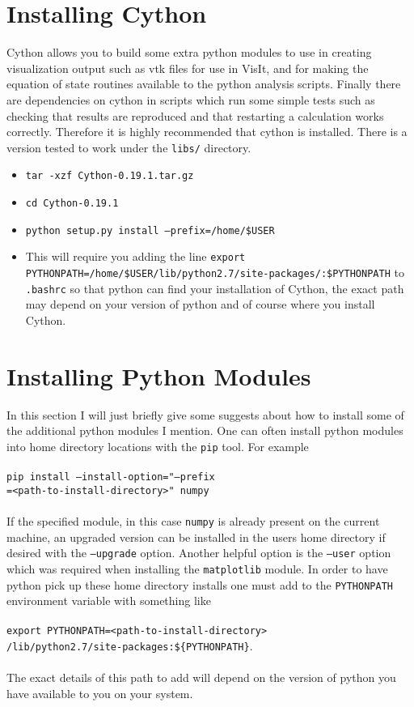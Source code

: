 \documentclass[12pt,a4paper]{book}
\begin{document}
\section{Installing Cython}
Cython allows you to build some extra python modules to use in creating visualization output such as vtk files for use in VisIt, and for making the equation of state routines available to the python analysis scripts. Finally there are dependencies on cython in scripts which run some simple tests such as checking that results are reproduced and that restarting a calculation works correctly. Therefore it is highly recommended that cython is installed. There is a version tested to work under the {\tt libs/} directory.
\begin{itemize}
\item {\tt tar -xzf Cython-0.19.1.tar.gz}
\item {\tt cd Cython-0.19.1}
\item {\tt  python setup.py install --prefix=/home/\-\$USER}
\item This will require you adding the  line {\tt export PYTHONPATH\-=/home/\$USER/\-lib/\-python2.7/\-site-packages/\-:\$PYTHONPATH} to {\tt .bashrc} so that python can find your installation of Cython, the exact path may depend on your version of python and of course where you install Cython.
\end{itemize}

\section{Installing Python Modules}
In this section I will just briefly give some suggests about how to install some of the additional python modules I mention. One can often install python modules into home directory locations with the {\tt pip} tool. For example \\
 \\
{\tt pip install --install-option="--prefix}\\
{\tt=<path-to-install-directory>" numpy}\\
 \\
If the specified module, in this case {\tt numpy} is already present on the current machine, an upgraded version can be installed in the users home directory if desired with the {\tt --upgrade} option. Another helpful option is the {\tt --user} option which was required when installing the {\tt matplotlib} module. In order to have python pick up these home directory installs one must add to the {\tt PYTHONPATH} environment variable with something like \\
 \\
{\tt export PYTHONPATH=<path-to-install-directory>}\\
{\tt /lib/python2.7/site-packages:\$\{PYTHONPATH\}}.\\
 \\
The exact details of this path to add will depend on the version of python you have available to you on your system.
\end{document}
